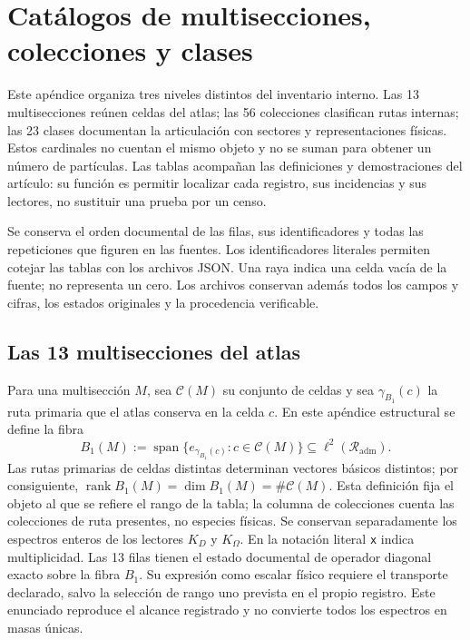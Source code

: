 \clearpage
\section{Catálogos de multisecciones, colecciones y clases}
\label{sec:vi-catalogos-estructurales}

Este apéndice organiza tres niveles distintos del inventario interno. Las
13 multisecciones reúnen celdas del atlas; las 56 colecciones clasifican rutas
internas; las 23 clases documentan la articulación con sectores y
representaciones físicas. Estos cardinales no cuentan el mismo objeto y
no se suman para obtener un número de partículas. Las tablas acompañan las
definiciones y demostraciones del artículo: su función es permitir localizar
cada registro, sus incidencias y sus lectores, no sustituir una prueba por un censo.

Se conserva el orden documental de las filas, sus identificadores y todas
las repeticiones que figuren en las fuentes. Los identificadores literales
permiten cotejar las tablas con los archivos JSON. Una raya indica una celda
vacía de la fuente; no representa un cero. Los archivos conservan además todos
los campos y cifras, los estados originales y la procedencia verificable.
\CatalogRouteReference

\subsection{Las 13 multisecciones del atlas}

Para una multisección \(M\), sea \(\mathcal C(M)\) su conjunto de celdas y
sea \(\gamma_{B_1}(c)\) la ruta primaria que el atlas conserva en la celda
\(c\). En este apéndice estructural se define la fibra
\[
 B_1(M):=
 \operatorname{span}\bigl\{e_{\gamma_{B_1}(c)}:c\in\mathcal C(M)\bigr\}
 \subseteq \ell^2(\mathcal R_{\mathrm{adm}}).
\]
Las rutas primarias de celdas distintas determinan vectores básicos distintos;
por consiguiente,
\(\operatorname{rank}B_1(M)=\dim B_1(M)=\#\mathcal C(M)\).
Esta definición fija el objeto al que se refiere el rango de la tabla; la
columna de colecciones cuenta las
colecciones de ruta presentes, no especies físicas. Se conservan separadamente
los espectros enteros de los lectores \(K_D\) y \(K_\Omega\).
En la notación literal \texttt{x} indica multiplicidad. Las 13 filas tienen
el estado documental de operador diagonal exacto sobre la fibra \(B_1\).
Su expresión como escalar físico requiere el transporte declarado, salvo
la selección de rango uno prevista en el propio registro. Este enunciado
reproduce el alcance registrado y no convierte todos los espectros en masas únicas.

